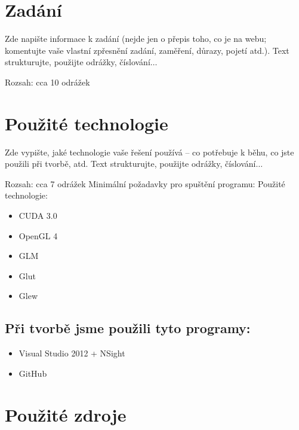 \documentclass[12pt,a4paper,titlepage,final]{report}
\begin{document}
	\def\authora{Michal Riša}
	\def\authorb{Pavel Macenauer}
	\def\emaila{xbures19@stud.fit.vutbr.cz}
	\def\emailb{xmacen02@stud.fit.vutbr.cz}
	\def\docname{Počítačová grafika}
	\def\projname{Raytracing na CUDA}
	
	\newpage
	\pagestyle{plain}
	\setcounter{page}{1}
	\setcounter{secnumdepth}{-1}
	\setlength{\parindent}{1cm}	

\section{Zadání}

Zde napište informace k zadání (nejde jen o přepis toho, co je na webu;
komentujte vaše vlastní zpřesnění zadání, zaměření, důrazy, pojetí atd.). Text
strukturujte, použijte odrážky, číslování$\ldots$

Rozsah: cca 10 odrážek

\section{Použité technologie}

Zde vypište, jaké technologie vaše řešení používá – co potřebuje k běhu, co
jste použili při tvorbě, atd. Text strukturujte, použijte odrážky,
číslování$\ldots$

Rozsah: cca 7 odrážek
Minimální požadavky pro spuštění programu:
Použité technologie:
\begin{itemize}
	\item CUDA 3.0
	\item OpenGL 4
	\item GLM
	\item Glut
	\item Glew
\end{itemize}
\subsection{Při tvorbě jsme použili tyto programy:}
\begin{itemize}
	\item Visual Studio 2012 + NSight
	\item GitHub
\end{itemize}
\section{Použité zdroje}
\end{document}
